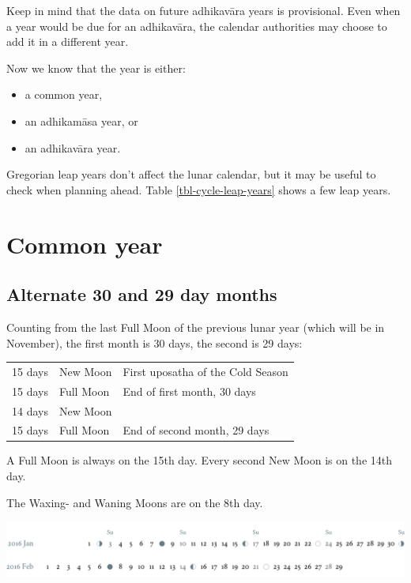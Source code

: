 \documentclass[11pt,oneside]{memoir-article}
\begin{document}
Keep in mind that the data on future adhikavāra years is provisional. Even when
a year would be due for an adhikavāra, the calendar authorities may choose to
add it in a different year.

Now we know that the year is either:

\begin{itemize}
\item a common year,
\item an adhikamāsa year, or
\item an adhikavāra year.
\end{itemize}

Gregorian leap years don't affect the lunar calendar, but it may be useful to
check when planning ahead. Table \ref{tbl-cycle-leap-years} shows a few leap
years.

\section{Common year}
\label{sec-1-2}
\label{common-year}
\subsection{Alternate 30 and 29 day months}
\label{sec-1-2-1}

Counting from the last Full Moon of the previous lunar year (which will be in
November), the first month is 30 days, the second is 29 days:

\begin{center}
\begin{tabular}{lll}
15 days & \mN{} New Moon & First uposatha of the Cold Season\\
15 days & \mF{} Full Moon & End of first month, 30 days\\
14 days & \mN{} New Moon & \\
15 days & \mF{} Full Moon & End of second month, 29 days\\
\end{tabular}
\end{center}

A Full Moon is always on the 15th day. Every second New Moon is on the 14th day.

The \GaWaxingmoon{} Waxing- and \GaWaningmoon{} Waning Moons are on the 8th day.

\begin{fullwidth}
\includegraphics[width=\linewidth]{two-months.pdf}
\end{fullwidth}
\end{document}

